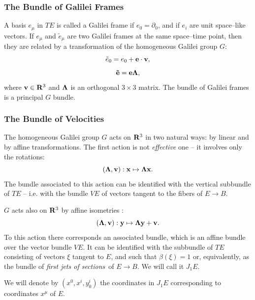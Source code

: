 \documentclass[12pt]{article}
\def\be{\begin{equation}} \def\ee{\end{equation}}
\begin{document}
\subsubsection{The Bundle of Galilei Frames}
A basis $e_{\mu}$ in $TE$ is called a Galilei frame if
$e_0=\partial_0$,  and if $e_i$ are unit space--like vectors.  If
$e_\mu$ and $\tilde{e}_\mu$ are two Galilei frames at the same
space--time point,  then they are related by a transformation of the homogeneous
Galilei group $G$: 
\be
\tilde{e}_0=e_0+{\bf e\cdot v} , 
\ee
\be
{\bf \tilde{e}}={\bf e}{\bf\Lambda} , 
\ee
where ${\bf v}\in {\bf R}^3$ and ${\bf \Lambda}$ is an orthogonal
$3\times 3$ matrix. 
The bundle of Galilei frames is a principal $G$ bundle. 
\subsubsection{The Bundle of Velocities }
The homogeneous Galilei group $G$ acts on ${\bf R}^3$ in two
natural ways:  by linear and by affine transformations.  The first
action is not {\sl effective} one -- it involves only the rotations:
\be
 ({\bf \Lambda}, {\bf v}): {\bf x}\mapsto {\bf\Lambda x}. 
\ee
The bundle associated to this action can be identified with the
vertical subbundle of $TE$ -- i.e.  with the bundle $VE$ of vectors
tangent to the fibers of $E\rightarrow B$.

$G$ acts also on ${\bf R}^3$ by affine
isometries : 
\be
 ({\bf \Lambda}, {\bf v}): {\bf y}\mapsto {\bf\Lambda y}+{\bf v}  . 
\ee
To this action there corresponds an associated bundle,  which is an
affine bundle over the vector bundle $VE$. 
 It can be identified with the subbundle of $TE$ consisting of
vectors $\xi$ tangent to $E$, and such that $\beta  (\xi )=1$ or,
equivalently,  as the bundle of {\sl first jets of sections}\, of
$E\rightarrow B$.  We will call it  $J_1E$.

We will denote by $ (x^0, x^{i}, y_0^{i})$ the coordinates in $J_1E$
corresponding to coordinates $x^{\mu}$  of $E$.  
\end{document}
